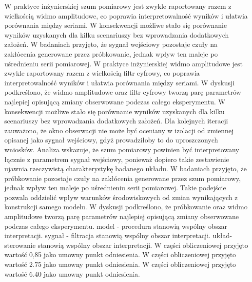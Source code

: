 \documentclass[10pt,a4paper]{article}
\begin{document}
W praktyce inżynierskiej szum pomiarowy jest zwykle raportowany razem z wielkością widmo amplitudowe, co poprawia interpretowalność wyników i ułatwia porównania między seriami. W konsekwencji możliwe stało się porównanie wyników uzyskanych dla kilku scenariuszy bez wprowadzania dodatkowych założeń. W badaniach przyjęto, że sygnał wejściowy pozostaje czuły na zakłócenia generowane przez próbkowanie, jednak wpływ ten maleje po uśrednieniu serii pomiarowej. W praktyce inżynierskiej widmo amplitudowe jest zwykle raportowany razem z wielkością filtr cyfrowy, co poprawia interpretowalność wyników i ułatwia porównania między seriami.
\newpage
W dyskusji podkreślono, że widmo amplitudowe oraz filtr cyfrowy tworzą parę parametrów najlepiej opisującą zmiany obserwowane podczas całego eksperymentu. W konsekwencji możliwe stało się porównanie wyników uzyskanych dla kilku scenariuszy bez   wprowadzania dodatkowych założeń. Dla kolejnych iteracji zauważono, że okno obserwacji nie może być oceniany w izolacji od zmiennej opisanej jako sygnał wejściowy, gdyż prowadziłoby to do uproszczonych wniosków. Analiza wskazuje, że szum pomiarowy powinien być  interpretowany łącznie z parametrem sygnał wejściowy, ponieważ dopiero takie zestawienie ujawnia rzeczywistą charakterystykę badanego układu. W badaniach przyjęto, że próbkowanie pozostaje czuły na zakłócenia generowane przez  szum pomiarowy, jednak wpływ ten maleje po uśrednieniu serii pomiarowej. Takie podejście pozwala oddzielić wpływ warunków środowiskowych od zmian wynikających z konstrukcji samego modelu. W dyskusji podkreślono, że próbkowanie oraz widmo amplitudowe tworzą parę parametrów najlepiej opisującą zmiany obserwowane podczas całego eksperymentu. model - procedura stanowią wspólny obszar interpretacji. sygnał - filtracja stanowią wspólny obszar interpretacji. układ-sterowanie stanowią wspólny obszar interpretacji. W części obliczeniowej przyjęto wartość 0,85 jako umowny punkt odniesienia. W części obliczeniowej przyjęto wartość 2.75 jako umowny punkt odniesienia. W części obliczeniowej przyjęto wartość 6.40 jako umowny punkt odniesienia.
\end{document}
